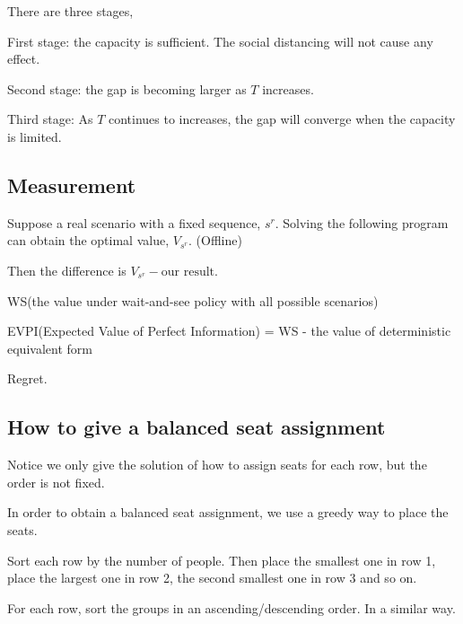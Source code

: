 There are three stages, 

First stage: the capacity is sufficient. The social distancing will not cause any effect.

Second stage: the gap is becoming larger as $T$ increases. 

Third stage: As $T$ continues to increases, the gap will converge when the capacity is limited.



\subsection{Measurement}

Suppose a real scenario with a fixed sequence, $s^{r}$. Solving the following program can obtain the optimal value, $V_{s^{r}}$. (Offline)

Then the difference is $V_{s^{r}} - \text{our result}$.

WS(the value under wait-and-see policy with all possible scenarios)

EVPI(Expected Value of Perfect Information) = WS - the value of deterministic equivalent form

Regret.


\subsection{How to give a balanced seat assignment}

Notice we only give the solution of how to assign seats for each row, but the order is not fixed.

In order to obtain a balanced seat assignment, we use a greedy way to place the seats.

Sort each row by the number of people. Then place the smallest one in row 1, place the largest one in row 2, the second smallest one in row 3 and so on. 

For each row, sort the groups in an ascending/descending order. In a similar way.

\newpage
